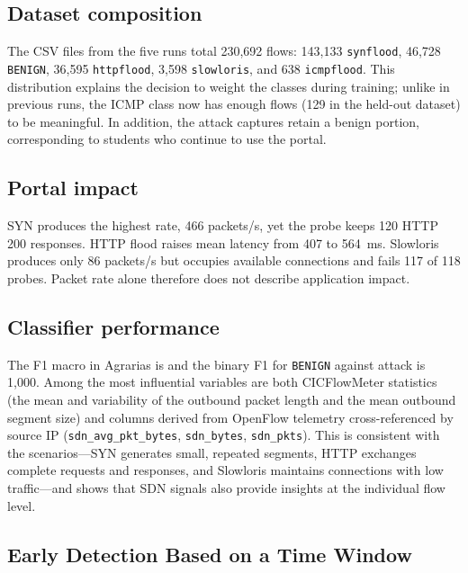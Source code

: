 \documentclass[ASNA,twocolumn]{USG}
\begin{document}
  \subsection{Dataset composition}

  The CSV files from the five runs total 230,692 flows: 143,133 \texttt{synflood}, 46,728 \texttt{BENIGN}, 36,595 \texttt{httpflood}, 3,598 \texttt{slowloris}, and 638 \texttt{icmpflood}. This distribution explains the decision to weight the classes during training; unlike in previous runs, the ICMP class now has enough flows (129 in the held-out dataset) to be meaningful. In addition, the attack captures retain a benign portion, corresponding to students who continue to use the portal.


  \subsection{Portal impact}
  


  SYN produces the highest rate, 466 packets/s, yet the probe keeps 120 HTTP 200 responses. HTTP flood raises mean latency from 407 to 564~ms. Slowloris produces only 86 packets/s but occupies available connections and fails 117 of 118 probes. Packet rate alone therefore does not describe application impact.

  \subsection{Classifier performance}
  

  The F1 macro in Agrarias is \Fmacro and the binary F1 for \texttt{BENIGN} against attack is 1{,}000. Among the most influential variables are both CICFlowMeter statistics (the mean and variability of the outbound packet length and the mean outbound segment size) and columns derived from OpenFlow telemetry cross-referenced by source IP (\texttt{sdn\_avg\_pkt\_bytes}, \texttt{sdn\_bytes}, \texttt{sdn\_pkts}). This is consistent with the scenarios—SYN generates small, repeated segments, HTTP exchanges complete requests and responses, and Slowloris maintains connections with low traffic—and shows that SDN signals also provide insights at the individual flow level.


  \subsection{Early Detection Based on a Time Window}
\end{document}
